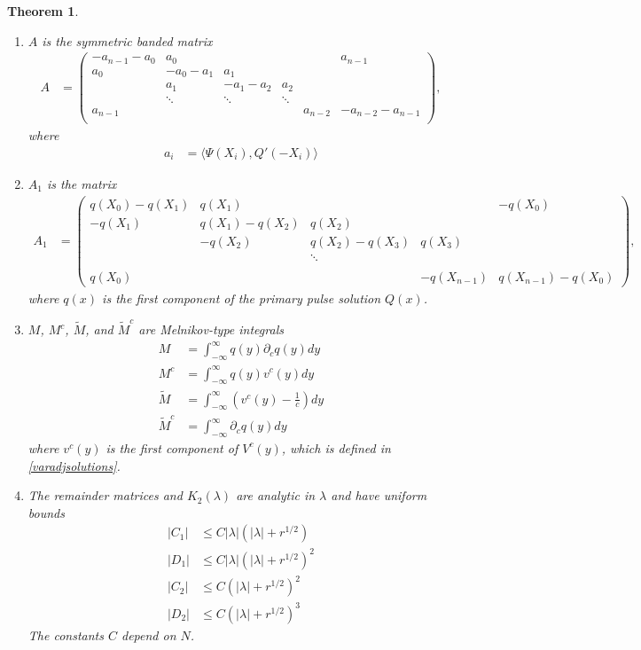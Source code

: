 \documentclass[11pt,reqno]{amsart}
\theoremstyle{plain}
\newtheorem{theorem}{Theorem}
\theoremstyle{definition}
\theoremstyle{remark}
\begin{document}
\begin{theorem}
\begin{enumerate}
\item $A$ is the symmetric banded matrix
\begin{align}\label{Asymm}
A &= \begin{pmatrix}
-a_{n-1} - a_0 & a_0 & & &  & a_{n-1}\\
a_0 & -a_0 - a_1 &  a_1 \\
& a_1 & -a_1 - a_2 &  a_2 \\
& \ddots & \ddots & \ddots \\
a_{n-1} & & & & a_{n-2} & -a_{n-2} - a_{n-1} \\
\end{pmatrix},
\end{align}
where
\begin{align*}
a_i &= \langle \Psi(X_i), Q'(-X_i) \rangle
\end{align*}

\item $A_1$ is the matrix
\begin{align*}
A_1 &= \begin{pmatrix}
q(X_0) - q(X_1) & q(X_1) &&& -q(X_0) \\
-q(X_1) & q(X_1) - q(X_2) & q(X_2) \\
& -q(X_2) & q(X_2) - q(X_3) & q(X_3) \\ && \ddots \\
\\
q(X_0) &&& -q(X_{n-1}) & q(X_{n-1}) - q(X_0) 
\end{pmatrix},
\end{align*}
where $q(x)$ is the first component of the primary pulse solution $Q(x)$. 

\item $M$, $M^c$, $\tilde{M}$, and $\tilde{M}^c$ are  Melnikov-type integrals
\begin{align*}
M &= \int_{-\infty}^\infty q(y) \partial_c q(y) dy \\
M^c &= \int_{-\infty}^\infty q(y) v^c(y) dy \\
\tilde{M} &= \int_{-\infty}^{\infty} \left(v^c(y) - \frac{1}{c}\right) dy \\
\tilde{M}^c &= \int_{-\infty}^\infty \partial_c q(y) dy
\end{align*}
where $v^c(y)$ is the first component of $V^c(y)$, which is defined in \cref{varadjsolutions}.

\item The remainder matrices and $K_2(\lambda)$ are analytic in $\lambda$ and have uniform bounds
\begin{align*}
|C_1| &\leq C |\lambda|(|\lambda| + r^{1/2}) \\
|D_1| &\leq C |\lambda|(|\lambda| + r^{1/2})^2 \\
|C_2| &\leq C (|\lambda| + r^{1/2})^2 \\
|D_2| &\leq C (|\lambda| + r^{1/2})^3 
\end{align*}
The constants $C$ depend on $N$.
\end{enumerate}
\end{theorem}
\end{document}
